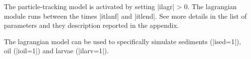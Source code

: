 The particle-tracking model is activated by setting |ilagr| > 0.
The lagrangian module runs between the times |itlanf| and |itlend|.
See more details in the list of parameters and they description 
reported in the appendix.

The lagrangian model can be used to specifically simulate sediments
(|ised=1|), oil (|ioil=1|) and larvae (|ilarv=1|).
